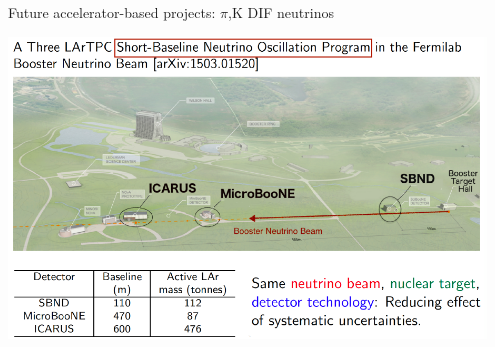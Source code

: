 \begin{frame}[t]{Future accelerator-based projects: $\pi$,K DIF neutrinos}

\begin{center}
  \includegraphics[width=0.95\textwidth]{./images/beyond3nu/sbn_1.png}\\
\end{center}
\end{frame}

